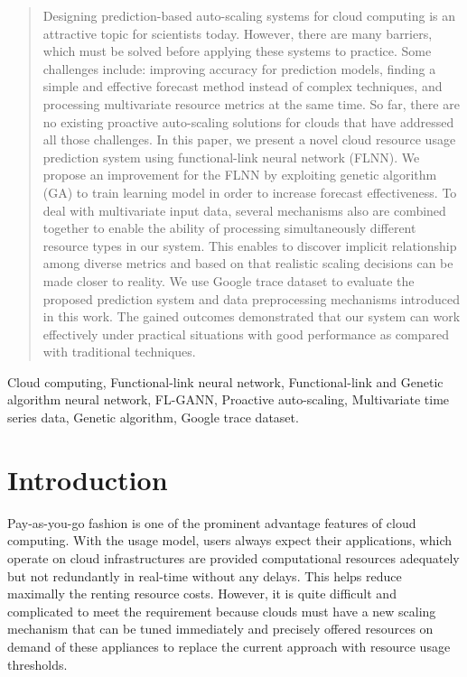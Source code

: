 \documentclass[conference]{IEEEtran}
\begin{document}
\begin{abstract}
Designing prediction-based auto-scaling systems for cloud computing is an attractive topic for scientists today. However, there are many barriers, which must be solved before applying these systems to practice. Some challenges include: improving accuracy for prediction models, finding a simple and effective forecast method instead of complex techniques, and processing multivariate resource metrics at the same time. So far, there are no existing proactive auto-scaling solutions for clouds that have addressed all those challenges. In this paper, we present a novel cloud resource usage prediction system using functional-link neural network (FLNN). We propose an improvement for the FLNN by exploiting genetic algorithm (GA) to train learning model in order to increase forecast effectiveness. To deal with multivariate input data, several mechanisms also are combined together to enable the ability of processing simultaneously different resource types in our system. This enables to discover implicit relationship among diverse metrics and based on that realistic scaling decisions can be made closer to reality. We use Google trace dataset to evaluate the proposed prediction system and data preprocessing mechanisms introduced in this work. The gained outcomes demonstrated that our system can work effectively under practical situations with good performance as compared with traditional techniques.
\end{abstract}

\begin{IEEEkeywords}
Cloud computing, Functional-link neural network, Functional-link and Genetic algorithm neural network, FL-GANN, Proactive auto-scaling, Multivariate time series data, Genetic algorithm, Google trace dataset.
\end{IEEEkeywords}

\section{Introduction}
\label{intro}
Pay-as-you-go fashion is one of the prominent advantage features of cloud computing. With the usage model, users always expect their applications, which operate on cloud infrastructures are provided computational resources adequately but not redundantly in real-time without any delays. This helps reduce maximally the renting resource costs. However, it is quite difficult and complicated to meet the requirement because clouds must have a new scaling mechanism that can be tuned immediately and precisely offered resources on demand of these appliances to replace the current approach with resource usage thresholds. 
\end{document}
